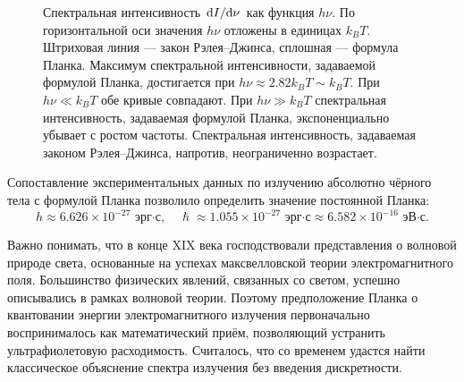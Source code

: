 \documentclass[a4paper, 12pt]{article}
\begin{document}
\begin{figure}[h!]
  \centering
  \caption{Спектральная интенсивность $\dv*{I}{\nu}$ как
  функция $h\nu$. По горизонтальной оси значения $h\nu$ отложены в единицах
  $k_BT$. Штриховая линия --- закон Рэлея--Джинса, сплошная ---
  формула Планка. Максимум спектральной интенсивности, задаваемой формулой
  Планка, достигается при $h\nu \approx 2.82 k_BT \sim k_BT$. При
  $h\nu\ll k_BT$ обе кривые совпадают. При
  $h\nu\gg k_BT$ спектральная интенсивность, задаваемая формулой
  Планка, экспоненциально убывает с ростом частоты. Спектральная
  интенсивность, задаваемая законом Рэлея--Джинса, напротив, неограниченно
  возрастает.}
  \label{fig:planck-vs-rayleigh-jeans}
\end{figure}

Сопоставление экспериментальных данных по излучению абсолютно чёрного тела с формулой Планка
позволило определить значение постоянной Планка:
\[
h \approx 6.626 \times 10^{-27} \text{ эрг·с}, \quad \hslash \approx 1.055 \times 10^{-27} \text{ эрг·с}\approx 6.582 \times 10^{-16} \text{ эВ·с}.
\]

Важно понимать, что в конце XIX века господствовали представления о волновой природе света,
основанные на успехах максвелловской теории электромагнитного поля. Большинство физических
явлений, связанных со светом, успешно описывались в рамках волновой теории. Поэтому
предположение Планка о квантовании энергии электромагнитного излучения первоначально воспринималось
как математический приём, позволяющий устранить ультрафиолетовую расходимость.
Считалось, что со временем удастся найти классическое объяснение спектра излучения
без введения дискретности.
\end{document}
